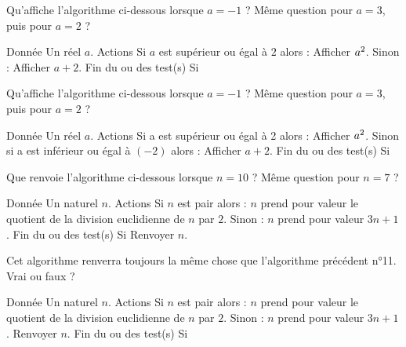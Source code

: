 \begin{multicols}{2}
    \algoname{}
    Qu'affiche l'algorithme ci-dessous lorsque $a=-1$ ?
    Même question pour $a=3$, puis pour $a=2$ ?
    \bigskip
    \begin{myverb}
Donnée
    Un réel \(a\).
Actions
    Si \(a\) est supérieur ou égal à \(2\) alors :
        Afficher \(a\sp{2}\).
    Sinon :
        Afficher \(a+2\).
    Fin du ou des test(s) Si
    \end{myverb}

    \switchcol

    \algoname{}
    Qu'affiche l'algorithme ci-dessous lorsque $a=-1$ ?
    Même question pour $a=3$, puis pour $a=2$ ?
    \bigskip
    \begin{myverb}
Donnée
    Un réel \(a\).
Actions
    Si a est supérieur ou égal à 2 alors :
        Afficher \(a\sp{2}\).
    Sinon si a est inférieur ou égal à \((-2)\) alors :
        Afficher \(a+2\).
    Fin du ou des test(s) Si
    \end{myverb}
\end{multicols}

\algorule

\begin{multicols}{2}
    \algoname{}
    Que renvoie l'algorithme ci-dessous lorsque $n=10$ ?
    Même question pour $n=7$ ?
    \bigskip
    \begin{myverb}
Donnée
    Un naturel \(n\).
Actions
    Si \(n\) est pair alors :
        \(n\) prend pour valeur le quotient de
        la division euclidienne de \(n\) par \(2\).
    Sinon :
        \(n\) prend pour valeur \(3n+1\).
    Fin du ou des test(s) Si
    Renvoyer \(n\).
    \end{myverb}

    \switchcol

    \algoname{}
    Cet algorithme renverra toujours la même chose que l'algorithme précédent n°11.
    Vrai ou faux ?
    \bigskip
    \begin{myverb}
Donnée
    Un naturel \(n\).
Actions
    Si \(n\) est pair alors :
        \(n\) prend pour valeur le quotient de
        la division euclidienne de \(n\) par \(2\).
    Sinon :
        \(n\) prend pour valeur \(3n+1\).
        Renvoyer \(n\).
    Fin du ou des test(s) Si
    \end{myverb}
\end{multicols}

\algorule

